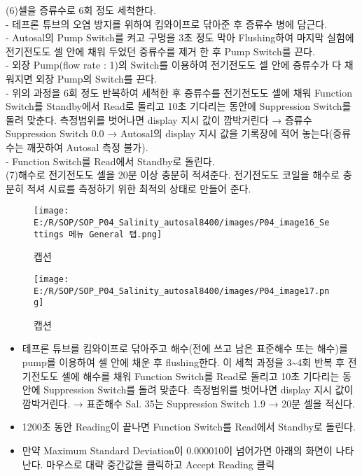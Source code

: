 \documentclass[
]{book}
\providecommand{\tightlist}{%
  \setlength{\itemsep}{0pt}\setlength{\parskip}{0pt}}
\begin{document}
(6)셀을 증류수로 6회 정도 세척한다.\\
- 테프론 튜브의 오염 방지를 위하여 킴와이프로 닦아준 후 증류수 병에 담근다.\\
- Autosal의 Pump Switch를 켜고 구멍을 3초 정도 막아 Flushing하여 마지막 실험에 전기전도도 셀 안에 채워 두었던 증류수를 제거 한 후 Pump Switch를 끈다.\\
- 외장 Pump(flow rate : 1)의 Switch를 이용하여 전기전도도 셀 안에 증류수가 다 채워지면 외장 Pump의 Switch를 끈다.\\
- 위의 과정을 6회 정도 반복하여 세척한 후 증류수를 전기전도도 셀에 채워 Function Switch를 Standby에서 Read로 돌리고 10초 기다리는 동안에 Suppression Switch를 돌려 맞춘다. 측정범위를 벗어나면 display 지시 값이 깜박거린다 → 증류수 Suppression Switch 0.0 → Autosal의 display 지시 값을 기록장에 적어 놓는다(증류수는 깨끗하여 Autosal 측정 불가).\\
- Function Switch를 Read에서 Standby로 돌린다.\\
(7)해수로 전기전도도 셀을 20분 이상 충분히 적셔준다. 전기전도도 코일을 해수로 충분히 적셔 시료를 측정하기 위한 최적의 상태로 만들어 준다.

\begin{figure}
\centering
\texttt{[image: E:/R/SOP/SOP\_P04\_Salinity\_autosal8400/images/P04\_image16\_Settings 메뉴 General 탭.png]}
\caption{캡션}
\end{figure}

\begin{figure}
\centering
\texttt{[image: E:/R/SOP/SOP\_P04\_Salinity\_autosal8400/images/P04\_image17.png]}
\caption{캡션}
\end{figure}

\begin{itemize}
\tightlist
\item
  테프론 튜브를 킴와이프로 닦아주고 해수(전에 쓰고 남은 표준해수 또는 해수)를 pump를 이용하여 셀 안에 채운 후 flushing한다. 이 세척 과정을 3\textasciitilde4회 반복 후 전기전도도 셀에 해수를 채워 Function Switch를 Read로 돌리고 10초 기다리는 동안에 Suppression Switch를 돌려 맞춘다. 측정범위를 벗어나면 display 지시 값이 깜박거린다. → 표준해수 Sal. 35는 Suppression Switch 1.9 → 20분 셀을 적신다.\\
\item
  1200초 동안 Reading이 끝나면 Function Switch를 Read에서 Standby로 돌린다.\\
\item
  만약 Maximum Standard Deviation이 0.000010이 넘어가면 아래의 화면이 나타난다. 마우스로 대략 중간값을 클릭하고 Accept Reading 클릭
\end{itemize}
\end{document}
